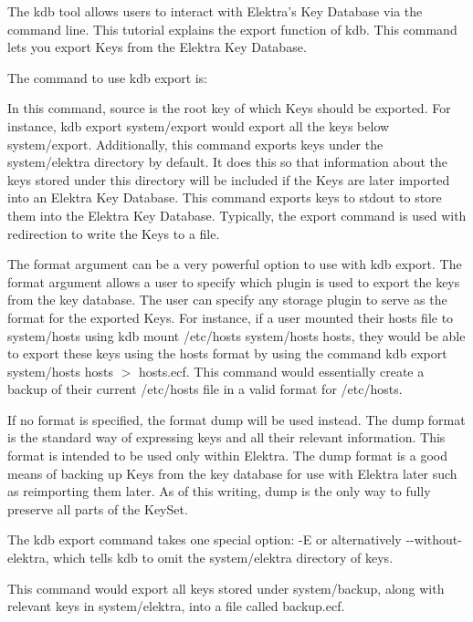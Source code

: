 The kdb tool allows users to interact with Elektra’s Key Database via the command line. This tutorial explains the export function of kdb. This command lets you export Keys from the Elektra Key Database.

The command to use kdb export is\+:


\begin{DoxyCode}{0}
\end{DoxyCode}


In this command, source is the root key of which Keys should be exported. For instance, {\ttfamily kdb export system/export} would export all the keys below {\ttfamily system/export}. Additionally, this command exports keys under the {\ttfamily system/elektra} directory by default. It does this so that information about the keys stored under this directory will be included if the Keys are later imported into an Elektra Key Database. This command exports keys to {\ttfamily stdout} to store them into the Elektra Key Database. Typically, the export command is used with redirection to write the Keys to a file.

The format argument can be a very powerful option to use with kdb export. The format argument allows a user to specify which plugin is used to export the keys from the key database. The user can specify any storage plugin to serve as the format for the exported Keys. For instance, if a user mounted their hosts file to {\ttfamily system/hosts} using {\ttfamily kdb mount /etc/hosts system/hosts hosts}, they would be able to export these keys using the hosts format by using the command {\ttfamily kdb export system/hosts hosts $>$ hosts.\+ecf}. This command would essentially create a backup of their current {\ttfamily /etc/hosts} file in a valid format for {\ttfamily /etc/hosts}.

If no format is specified, the format {\ttfamily dump} will be used instead. The dump format is the standard way of expressing keys and all their relevant information. This format is intended to be used only within Elektra. The dump format is a good means of backing up Keys from the key database for use with Elektra later such as reimporting them later. As of this writing, {\ttfamily dump} is the only way to fully preserve all parts of the {\ttfamily Key\+Set}.

The kdb export command takes one special option\+: {\ttfamily -\/E} or alternatively {\ttfamily -\/-\/without-\/elektra}, which tells {\ttfamily kdb} to omit the {\ttfamily system/elektra} directory of keys.


\begin{DoxyCode}{0}
\end{DoxyCode}


This command would export all keys stored under {\ttfamily system/backup}, along with relevant keys in {\ttfamily system/elektra}, into a file called {\ttfamily backup.\+ecf}. 